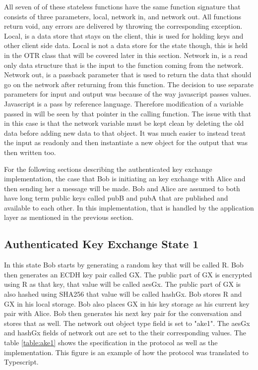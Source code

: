 All seven of of these stateless functions have the same function signature that consists of three parameters, local, network in, and network out. All functions return void, any errors are delivered by throwing the corresponding exception. Local, is a data store that stays on the client, this is used for holding keys and other client side data. Local is not a data store for the state though, this is held in the OTR class that will be covered later in this section. Network in, is a read only data structure that is the input to the function coming from the network. Network out, is a passback parameter that is used to return the data that should go on the network after returning from this function. The decision to use separate parameters for input and output was because of the way javascript passes values. Javascript is a pass by reference language. Therefore modification of a variable passed in will be seen by that pointer in the calling function. The issue with that in this case is that the network variable must be kept clean by deleting the old data before adding new data to that object. It was much easier to instead treat the input as readonly and then instantiate a new object for the output that was then written too.


For the following sections describing the authenticated key exchange implementation, the case that Bob is initiating an key exchange with Alice and then sending her a message will be made. Bob and Alice are assumed to both have long term public keys called pubB and pubA that are published and available to each other. In this implementation, that is handled by the application layer as mentioned in the previous section.


\subsection{Authenticated Key Exchange State 1}


In this state Bob starts by generating a random key that will be called R. Bob then generates an ECDH key pair called GX. The public part of GX is encrypted using R as that key, that value will be called aesGx. The public part of GX is also hashed using SHA256 that value will be called hashGx. Bob stores R and GX in his local storage. Bob also places GX in his key storage as his current key pair with Alice. Bob then generates his next key pair for the conversation and stores that as well. The network out object type field is set to "ake1". The aesGx and hashGx fields of network out are set to the their corresponding values. The table \ref{table:ake1} shows the specification in the protocol as well as the implementation. This figure is an example of how the protocol was translated to Typescript.


